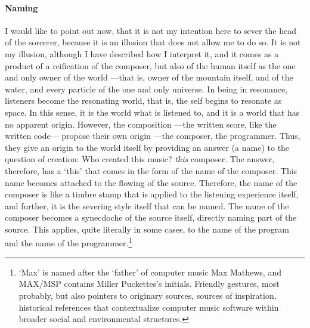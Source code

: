 \paragraph{Naming}
I would like to point out now, that it is not my intention here to sever the head of the sorcerer, because it is an illusion that does not allow me to do so. It is not my illusion, although I have described how I interpret it, and it comes as a product of a reification of the composer, but also of the human itself as the one and only owner of the world ---that is, owner of the mountain itself, and of the water, and every particle of the one and only universe. In being in resonance, listeners become the resonating world, that is, the self begins to resonate as space. In this sense, it is the world what is listened to, and it is a world that has no apparent origin. However, the composition ---the written score, like the written code--- propose their own origin ---the composer, the programmer. Thus, they give an origin to the world itself by providing an answer (a name) to the question of creation: Who created this music? \textit{this} composer. The answer, therefore, has a `this' that comes in the form of the name of the composer. This name becomes attached to the flowing of the source. Therefore, the name of the composer is like a timbre stamp that is applied to the listening experience itself, and further, it is the severing style itself that can be named. The name of the composer becomes a synecdoche of the source itself, directly naming part of the source. This applies, quite literally in some cases, to the name of the program and the name of the programmer.\footnote{`Max' is named after the `father' of computer music Max Mathews, and MAX/MSP contains Miller Puckettes's initials. Friendly gestures, most probably, but also pointers to originary sources, sources of inspiration, historical references that contextualize computer music software within broader social and environmental structures.}

